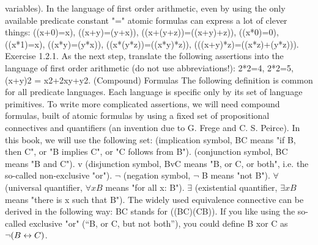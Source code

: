 variables).
In the language of first order arithmetic, even by using the only available predicate constant "=" atomic
formulas can express a lot of clever things:
((x+0)=x), ((x+y)=(y+x)), ((x+(y+z))=((x+y)+z)),
((x*0)=0), ((x*1)=x), ((x*y)=(y*x)), ((x*(y*z))=((x*y)*z)),
(((x+y)*z)=((x*z)+(y*z))).
Exercise 1.2.1. As the next step, translate the following assertions into the language of first order
arithmetic (do not use abbreviations!): 2*2=4, 2*2=5, (x+y)2 = x2+2xy+y2.
(Compound) Formulas
The following definition is common for all predicate languages. Each language is specific only by its
set of language primitives.
To write more complicated assertions, we will need compound formulas, built of atomic formulas by
using a fixed set of propositional connectives and quantifiers (an invention due to G. Frege and C. S.
Peirce). In this book, we will use the following set:
\IMPLIES  (implication symbol, B\IMPLIES C means "if B, then C", or "B implies C", or "C follows from B").
\AND  (conjunction symbol, B\AND C means "B and C").
v (disjunction symbol, BvC means "B, or C, or both", i.e. the so-called non-exclusive "or").
\(\neg\)  (negation symbol, \(\neg\) B means "not B").
\(\forall\)  (universal quantifier, \(\forall xB\) means "for all x: B").
\(\exists\)  (existential quantifier, \(\exists xB\) means "there is x such that B").
The widely used equivalence connective \IFF  can be derived in the following way: B\IFF C stands for
((B\IMPLIES C)\AND (C\IMPLIES B)). If you like using the so-called exclusive "or" (``B, or C, but not both''), you could
define B xor C as \(\neg (B\leftrightarrow C)\).

